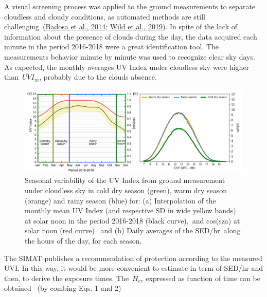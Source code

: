 \documentclass[10pt]{article}
\begin{document}
A visual screening process was applied to the ground measurements to
separate cloudless and cloudy conditions, as automated methods are still
challenging~\hyperref[csl:67]{(Badosa et al., 2014}; \hyperref[csl:68]{Wild et al., 2019)}. In spite of the lack of information
about the presence of clouds during the day, the data acquired each
minute in the period 2016-2018 were a great identification tool. The
measurements behavior minute by minute was used to recognize clear sky
days. As expected, the monthly averages UV Index under cloudless sky
were higher than~\(\overline{UVI}_m\), probably due to the clouds absence.
\begin{figure}[H]
\begin{center}
\includegraphics[width=0.98\columnwidth]{figures/season}
\caption{{Seasonal variability of the UV Index from ground measurement under
cloudless sky in cold dry season (green), warm dry season (orange) and
rainy season (blue) for: (a) Interpolation of the monthly mean UV Index
(and respective SD in wide yellow bands) at solar noon in the period
2016-2018 (black curve),~and cos(sza) at solar noon (red curve)~ and (b)
Daily averages of the SED/hr~along the hours of the day, for each
season.~
{\label{590688}}%
}}
\end{center}
\end{figure}

The SIMAT publishes a recommendation of protection according to the
measured UVI. In this way, it would be more convenient to estimate in
term of SED/hr and then, to derive the exposure times.
The~\(H_{er}\) expressed as function of time can be obtained~
(by combing Eqs. 1 and 2)
\end{document}
